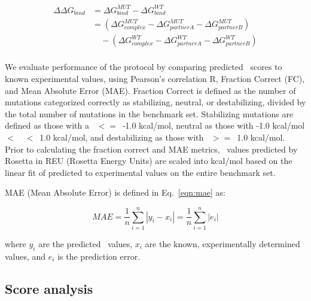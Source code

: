 \begin{equation}\label{eqn:split-ddg}
  \begin{split}
    {\Delta\Delta}G_{bind} & ={\Delta}G^{MUT}_{bind} - {\Delta}G^{WT}_{bind}\\
    & =({\Delta}G^{MUT}_{complex} - {\Delta}G^{MUT}_{partner A} - {\Delta}G^{MUT}_{partner B})\\
    & \quad - ({\Delta}G^{WT}_{complex} - {\Delta}G^{WT}_{partner A} - {\Delta}G^{WT}_{partner B})\\
  \end{split}
\end{equation}

We evaluate performance of the protocol by comparing predicted \ddg\ scores to known experimental values, using Pearson's correlation R, Fraction Correct (FC),  and Mean Absolute Error (MAE). Fraction Correct is defined as the number of mutations categorized correctly as stabilizing, neutral, or destabilizing, divided by the total number of mutations in the benchmark set. Stabilizing mutations are defined as those with a \ddg\ $<=$\ -1.0 kcal/mol, neutral as those with -1.0 kcal/mol $<$\ \ddg\ $<$\ 1.0 kcal/mol, and destabilizing as those with \ddg\ $>=$\ 1.0 kcal/mol. Prior to calculating the fraction correct and MAE metrics, \ddg\ values predicted by Rosetta in REU (Rosetta Energy Units) are scaled into kcal/mol based on the linear fit of predicted to experimental values on the entire benchmark set.

MAE (Mean Absolute Error) is defined in Eq.~\ref{eqn:mae} as:

\begin{equation}\label{eqn:mae}
  MAE = \dfrac{1}{n}\sum\limits_{i=1}^n|y_i-x_i| = \dfrac{1}{n}\sum\limits_{i=1}^n|e_i|
\end{equation}

where $y_i$ are the predicted \ddg\ values, $x_i$ are the known, experimentally determined values, and $e_i$ is the prediction error.

\subsection{Score analysis}


